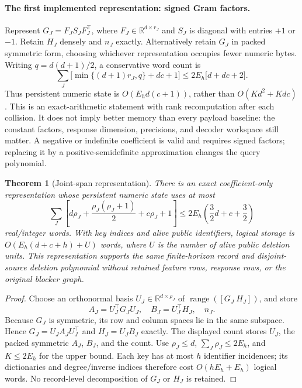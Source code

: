 \documentclass[11pt,a4paper]{article}
\newtheorem{theorem}{Theorem}[section]
\begin{document}
\paragraph{The first implemented representation: signed Gram factors.}
Represent $G_J=F_JS_JF_J^\top$, where $F_J\in\mathbb R^{d\times r_J}$ and
$S_J$ is diagonal with entries $+1$ or $-1$. Retain $H_J$ densely and
$n_J$ exactly. Alternatively retain $G_J$ in packed symmetric form, choosing
whichever representation occupies fewer numeric bytes. Writing
$q=d(d+1)/2$, a conservative word count is
\[
 \sum_J\bigl[\min\{(d+1)r_J,q\}+dc+1\bigr]
 \le 2E_h\bigl[d+dc+2\bigr].
\]
Thus persistent numeric state is $O(E_hd(c+1))$, rather than $O(Kd^2+Kdc)$.
This is an exact-arithmetic statement with rank recomputation after each
collision. It does not imply better memory than every payload baseline:
the constant factors, response dimension, precisions, and decoder workspace
still matter. A negative or indefinite coefficient is valid and requires
signed factors; replacing it by a positive-semidefinite approximation changes
the query polynomial.

\begin{theorem}[Joint-span representation]
There is an exact coefficient-only representation whose persistent numeric
state uses at most
\[
 \sum_J\left[d\rho_J+\frac{\rho_J(\rho_J+1)}2+
                    c\rho_J+1\right]
 \le 2E_h\left(\frac32d+c+\frac32\right)
\]
real/integer words. With key indices and alive public identifiers, logical
storage is $O(E_h(d+c+h)+U)$ words, where $U$ is the number of alive public
deletion units. This representation supports the same finite-horizon record
and disjoint-source deletion polynomial without retained feature rows,
response rows, or the original blocker graph.
\end{theorem}
\begin{proof}
Choose an orthonormal basis $U_J\in\mathbb R^{d\times\rho_J}$ of
$\operatorname{range}([G_J\ H_J])$, and store
\[
 A_J=U_J^\top G_JU_J,\quad B_J=U_J^\top H_J,\quad n_J.
\]
Because $G_J$ is symmetric, its row and column spaces lie in the same
subspace. Hence $G_J=U_JA_JU_J^\top$ and $H_J=U_JB_J$ exactly. The displayed
count stores $U_J$, the packed symmetric $A_J$, $B_J$, and the count.
Use $\rho_J\le d$, $\sum_J\rho_J\le2E_h$, and $K\le2E_h$ for the upper
bound. Each key has at most $h$ identifier incidences; its dictionaries and
degree/inverse indices therefore cost $O(hE_h+E_h)$ logical words. No
record-level decomposition of $G_J$ or $H_J$ is retained.
\end{proof}
\end{document}
